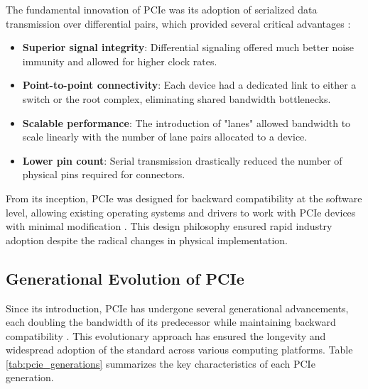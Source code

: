 The fundamental innovation of \ac{PCIe} was its adoption of serialized 
data transmission over differential pairs, which provided several 
critical advantages \parencite{johnson2010pcie}:

\begin{itemize}
    \item \textbf{Superior signal integrity}: Differential signaling offered much 
    better noise immunity and allowed for higher clock rates.
    
    \item \textbf{Point-to-point connectivity}: Each device had a dedicated link to 
    either a switch or the root complex, eliminating shared bandwidth bottlenecks.
    
    \item \textbf{Scalable performance}: The introduction of "lanes" allowed 
    bandwidth to scale linearly with the number of lane pairs allocated to a device.
    
    \item \textbf{Lower pin count}: Serial transmission drastically reduced the 
    number of physical pins required for connectors.
\end{itemize}

From its inception, \ac{PCIe} was designed for backward compatibility at the 
software level, allowing existing operating systems and drivers to work with 
\ac{PCIe} devices with minimal modification \parencite{budruk2003pci}. 
This design philosophy ensured rapid industry adoption despite the radical changes 
in physical implementation.

\subsection{Generational Evolution of PCIe}
\label{subsec:pcie_evolution}

Since its introduction, \ac{PCIe} has undergone several generational advancements, 
each doubling the bandwidth of its predecessor while maintaining backward 
compatibility \parencite{pcisig2019}. This evolutionary approach 
has ensured the longevity and widespread adoption of the standard across 
various computing platforms. Table \ref{tab:pcie_generations} summarizes 
the key characteristics of each \ac{PCIe} generation.


